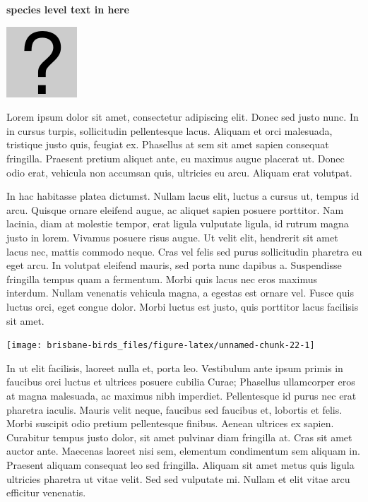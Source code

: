 \documentclass[]{book}
\let\origfigure\figure
\let\endorigfigure\endfigure
\renewenvironment{figure}[1][2] {
  \expandafter\origfigure\expandafter[H]
} {
  \endorigfigure
}
\begin{document}
\textbf{species level text in here}

\begin{figure}
\centering
\includegraphics{assets/missing.png}
\caption{No image for species}
\end{figure}

Lorem ipsum dolor sit amet, consectetur adipiscing elit. Donec sed justo
nunc. In in cursus turpis, sollicitudin pellentesque lacus. Aliquam et
orci malesuada, tristique justo quis, feugiat ex. Phasellus at sem sit
amet sapien consequat fringilla. Praesent pretium aliquet ante, eu
maximus augue placerat ut. Donec odio erat, vehicula non accumsan quis,
ultricies eu arcu. Aliquam erat volutpat.

In hac habitasse platea dictumst. Nullam lacus elit, luctus a cursus ut,
tempus id arcu. Quisque ornare eleifend augue, ac aliquet sapien posuere
porttitor. Nam lacinia, diam at molestie tempor, erat ligula vulputate
ligula, id rutrum magna justo in lorem. Vivamus posuere risus augue. Ut
velit elit, hendrerit sit amet lacus nec, mattis commodo neque. Cras vel
felis sed purus sollicitudin pharetra eu eget arcu. In volutpat eleifend
mauris, sed porta nunc dapibus a. Suspendisse fringilla tempus quam a
fermentum. Morbi quis lacus nec eros maximus interdum. Nullam venenatis
vehicula magna, a egestas est ornare vel. Fusce quis luctus orci, eget
congue dolor. Morbi luctus est justo, quis porttitor lacus facilisis sit
amet.

\begin{figure}
\texttt{[image: brisbane-birds\_files/figure-latex/unnamed-chunk-22-1]} \caption{insert figure caption}\label{fig:unnamed-chunk-22}
\end{figure}

In ut elit facilisis, laoreet nulla et, porta leo. Vestibulum ante ipsum
primis in faucibus orci luctus et ultrices posuere cubilia Curae;
Phasellus ullamcorper eros at magna malesuada, ac maximus nibh
imperdiet. Pellentesque id purus nec erat pharetra iaculis. Mauris velit
neque, faucibus sed faucibus et, lobortis et felis. Morbi suscipit odio
pretium pellentesque finibus. Aenean ultrices ex sapien. Curabitur
tempus justo dolor, sit amet pulvinar diam fringilla at. Cras sit amet
auctor ante. Maecenas laoreet nisi sem, elementum condimentum sem
aliquam in. Praesent aliquam consequat leo sed fringilla. Aliquam sit
amet metus quis ligula ultricies pharetra ut vitae velit. Sed sed
vulputate mi. Nullam et elit vitae arcu efficitur venenatis.
\end{document}
